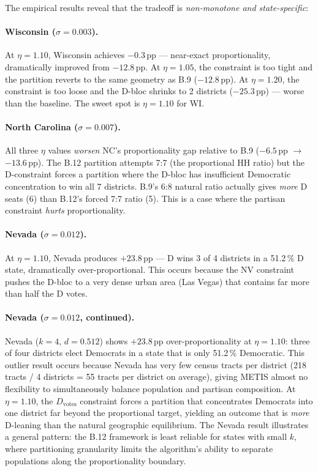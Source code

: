 The empirical results reveal that the tradeoff is \emph{non-monotone and state-specific}:

\paragraph{Wisconsin ($\sigma = 0.003$).}
At $\eta = 1.10$, Wisconsin achieves $-0.3$\,pp --- near-exact proportionality,
dramatically improved from $-12.8$\,pp.
At $\eta = 1.05$, the constraint is too tight and the partition reverts to the
same geometry as B.9 ($-12.8$\,pp).
At $\eta = 1.20$, the constraint is too loose and the D-bloc shrinks to
2 districts ($-25.3$\,pp) --- worse than the baseline.
The sweet spot is $\eta = 1.10$ for WI.

\paragraph{North Carolina ($\sigma = 0.007$).}
All three $\eta$ values \emph{worsen} NC's proportionality gap relative to B.9
($-6.5$\,pp $\to$ $-13.6$\,pp).
The B.12 partition attempts 7:7 (the proportional HH ratio) but the D-constraint
forces a partition where the D-bloc has insufficient Democratic concentration
to win all 7 districts.
B.9's 6:8 natural ratio actually gives \emph{more} D seats (6) than B.12's
forced 7:7 ratio (5).
This is a case where the partisan constraint \emph{hurts} proportionality.

\paragraph{Nevada ($\sigma = 0.012$).}
At $\eta = 1.10$, Nevada produces $+23.8$\,pp --- D wins 3 of 4 districts in
a 51.2\,\% D state, dramatically over-proportional.
This occurs because the NV constraint pushes the D-bloc to a very dense urban
area (Las Vegas) that contains far more than half the D votes.

\paragraph{Nevada ($\sigma = 0.012$, continued).}
Nevada ($k = 4$, $d = 0.512$) shows $+23.8$\,pp over-proportionality at
$\eta = 1.10$: three of four districts elect Democrats in a state that is only
51.2\,\% Democratic.
This outlier result occurs because Nevada has very few census tracts per
district (218 tracts / 4 districts = 55 tracts per district on average),
giving METIS almost no flexibility to simultaneously balance population and
partisan composition.
At $\eta = 1.10$, the $D_{\text{votes}}$ constraint forces a partition that
concentrates Democrats into one district far beyond the proportional target,
yielding an outcome that is \emph{more} D-leaning than the natural geographic
equilibrium.
The Nevada result illustrates a general pattern: the B.12 framework is least
reliable for states with small $k$, where partitioning granularity limits the
algorithm's ability to separate populations along the proportionality boundary.


